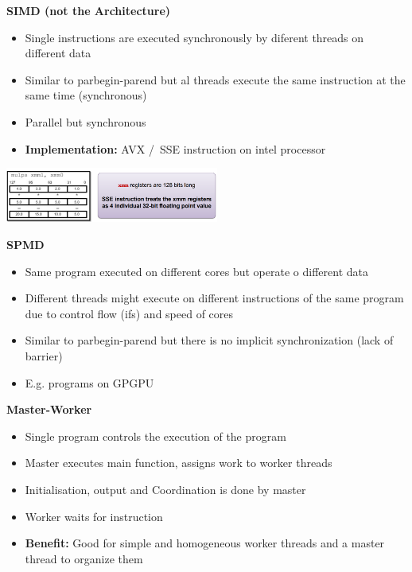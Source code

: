 \documentclass[10pt, landscape]{article}
\begin{document}
\begin{multicols}{4}
\textbf{SIMD (not the Architecture)}
\begin{itemize}
    \item Single instructions are executed synchronously by diferent threads on different data 
    \item Similar to parbegin-parend but al threads execute the same instruction at the same time (synchronous)
    \item Parallel but synchronous
    \item \textbf{Implementation: } AVX /\ SSE instruction on intel processor
\end{itemize}
\includegraphics*[width=7cm]{simd}

\textbf{SPMD}
\begin{itemize}
    \item Same program executed on different cores but operate o different data  
    \item Different threads might execute on different instructions of the same program due to control flow (ifs) and speed of cores
    \item Similar to parbegin-parend but there is no implicit synchronization (lack of barrier)
    \item E.g. programs on GPGPU
\end{itemize}

\textbf{Master-Worker}
\begin{itemize}
    \item Single program controls the execution of the program 
    \item Master executes main function, assigns work to worker threads
    \item Initialisation, output and Coordination is done by master
    \item Worker waits for instruction 
    \item \textbf{Benefit:} Good for simple and homogeneous worker threads and a master thread to organize them
\end{itemize}


\end{multicols}
\end{document}
